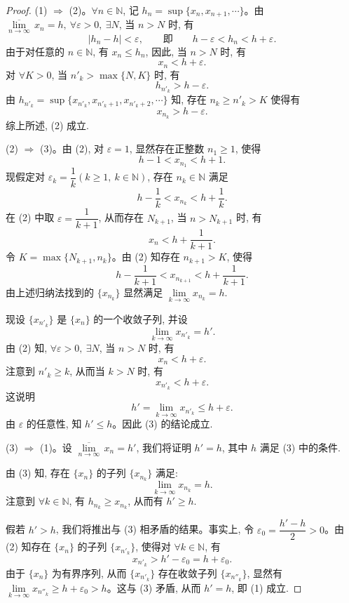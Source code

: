 \begin{proof}
(1) $\Rightarrow$ (2)。$\forall n\in\mathbb{N}$, 记 $h_n=\sup\{x_n,x_{n+1},\cdots\}$。由 $\overline{\lim\limits_{n\to\infty}}\,x_n=h,\ \forall\varepsilon>0,\ \exists N$, 当 $n>N$ 时, 有
\[
  |h_n-h|<\varepsilon,
  \qquad\text{即}\qquad h-\varepsilon<h_n<h+\varepsilon.
\]
由于对任意的 $n\in\mathbb{N}$, 有 $x_n\leqslant h_n$, 因此, 当 $n>N$ 时, 有
\[
  x_n<h+\varepsilon.
\]
对 $\forall K>0$, 当 $n'_k>\max\{N,K\}$ 时, 有
\[
  h_{n'_k}>h-\varepsilon.
\]
由 $h_{n'_k}=\sup\{x_{n'_k},x_{n'_k+1},x_{n'_k+2},\cdots\}$ 知, 存在 $n_k\geqslant n'_k>K$ 使得有
\[
  x_{n_k}>h-\varepsilon.
\]
综上所述, (2) 成立.

(2) $\Rightarrow$ (3)。由 (2), 对 $\varepsilon=1$, 显然存在正整数 $n_1\geqslant1$, 使得
\[
  h-1<x_{n_1}<h+1.
\]
现假定对 $\varepsilon_k=\dfrac1k(k\geqslant1,\ k\in\mathbb{N})$, 存在 $n_k\in\mathbb{N}$ 满足
\[
  h-\frac1k<x_{n_k}<h+\frac1k.
\]
在 (2) 中取 $\varepsilon=\dfrac1{k+1}$, 从而存在 $N_{k+1}$, 当 $n>N_{k+1}$ 时, 有
\[
  x_n<h+\frac1{k+1}.
\]
令 $K=\max\{N_{k+1},n_k\}$。由 (2) 知存在 $n_{k+1}>K$, 使得
\[
  h-\frac1{k+1}<x_{n_{k+1}}<h+\frac1{k+1}.
\]
由上述归纳法找到的 $\{x_{n_k}\}$ 显然满足 $\lim\limits_{k\to\infty}x_{n_k}=h$.

现设 $\{x_{n'_k}\}$ 是 $\{x_n\}$ 的一个收敛子列, 并设
\[
  \lim_{k\to\infty}x_{n'_k}=h'.
\]
由 (2) 知, $\forall\varepsilon>0,\ \exists N$, 当 $n>N$ 时, 有
\[
  x_n<h+\varepsilon.
\]
注意到 $n'_k\geqslant k$, 从而当 $k>N$ 时, 有
\[
  x_{n'_k}<h+\varepsilon.
\]
这说明
\[
  h'=\lim_{k\to\infty}x_{n'_k}\leqslant h+\varepsilon.
\]
由 $\varepsilon$ 的任意性, 知 $h'\leqslant h$。因此 (3) 的结论成立.

(3) $\Rightarrow$ (1)。设 $\overline{\lim\limits_{n\to\infty}}\,x_n=h'$, 我们将证明 $h'=h$, 其中 $h$ 满足 (3) 中的条件.

由 (3) 知, 存在 $\{x_n\}$ 的子列 $\{x_{n_k}\}$ 满足:
\[
  \lim_{k\to\infty}x_{n_k}=h.
\]
注意到 $\forall k\in\mathbb{N}$, 有 $h_{n_k}\geqslant x_{n_k}$, 从而有 $h'\geqslant h$.

假若 $h'>h$, 我们将推出与 (3) 相矛盾的结果。事实上, 令 $\varepsilon_0=\dfrac{h'-h}{2}>0$。由 (2) 知存在 $\{x_n\}$ 的子列 $\{x_{n'_k}\}$, 使得对 $\forall k\in\mathbb{N}$, 有
\[
  x_{n'_k}>h'-\varepsilon_0=h+\varepsilon_0.
\]
由于 $\{x_n\}$ 为有界序列, 从而 $\{x_{n'_k}\}$ 存在收敛子列 $\{x_{n''_k}\}$, 显然有 $\lim\limits_{k\to\infty}x_{n''_k}\geqslant h+\varepsilon_0>h$。这与 (3) 矛盾, 从而 $h'=h$, 即 (1) 成立.
\end{proof}


